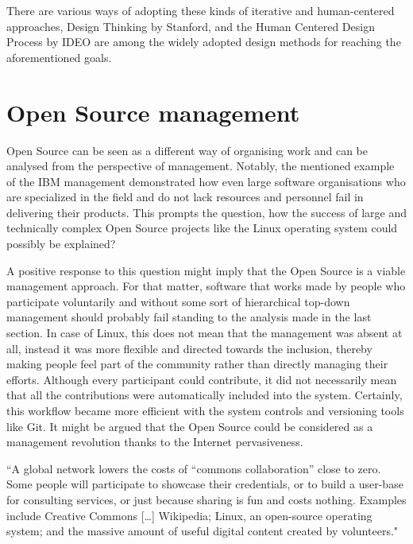 There are various ways of adopting these kinds of iterative and human-centered approaches, Design Thinking by Stanford, and the Human Centered Design Process by IDEO are among the widely adopted design methods for reaching the aforementioned goals.

\section{Open Source management}
\label{sec:OSManagement}

Open Source can be seen as a different way of organising work and can be analysed from the perspective of management. Notably, the mentioned example of the IBM management demonstrated how even large software organisations who are specialized in the field and do not lack resources and personnel fail in delivering their products. This prompts the question, how the success of large and technically complex Open Source projects like the Linux operating system could possibly be explained?

A positive response to this question might imply that the Open Source is a viable management approach. For that matter, software that works made by people who participate voluntarily and without some sort of hierarchical top-down management should probably fail standing to the analysis made in the last section. In case of Linux, this does not mean that the management was absent at all, instead it was more flexible and directed towards the inclusion, thereby making people feel part of the community rather than directly managing their efforts. Although every participant could contribute, it did not necessarily mean that all the contributions were automatically included into the system. Certainly, this workflow became more efficient with the system controls and versioning tools like Git.
It might be argued that the Open Source could be considered as a management revolution thanks to the Internet pervasiveness. 

\begin{displayquote}
    “A global network lowers the costs of “commons collaboration” close to zero. Some people will participate to showcase their credentials, or to build a user-base for consulting services, or just because sharing is fun and costs nothing. Examples include Creative Commons […] Wikipedia; Linux, an open-source operating system; and the massive amount of useful digital content created by volunteers."
\end{displayquote}

